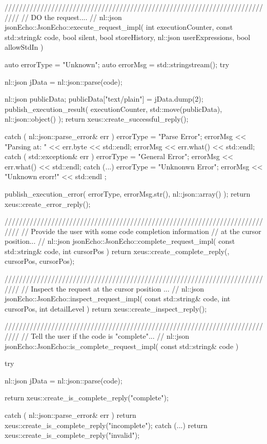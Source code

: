 ////////////////////////////////////////////////////////////////////////////
// DO the request....
//
nl::json jsonEcho::JsonEcho::execute_request_impl(
    int executionCounter,
    const std::string& code,
    bool silent,
    bool storeHistory,
    nl::json userExpressions,
    bool allowStdIn  
) {

  auto errorType = "Unknown";
  auto errorMsg = std::stringstream();
  try {

    nl::json jData = nl::json::parse(code);

    nl::json publicData;
    publicData["text/plain"] = jData.dump(2);
    publish_execution_result(
      executionCounter,
      std::move(publicData),
      nl::json::object()
    );
    return xeus::create_successful_reply();

  } catch ( nl::json::parse_error& err ) {
    errorType = "Parse Error";
    errorMsg << "Parsing at: " << err.byte << std::endl;
    errorMsg << err.what() << std::endl;
  } catch ( std::exception& err ) {
    errorType = "General Error";
    errorMsg << err.what() << std::endl;
  } catch (...) {
    errorType = "Unknonwn Error";
    errorMsg << "Unknown erorr!" << std::endl ;
  }

  publish_execution_error(
    errorType,
    errorMsg.str(),
    nl::json::array()
  );
  return xeus::create_error_reply();
}

////////////////////////////////////////////////////////////////////////////
// Provide the user with some code completion information 
// at the cursor position...
//
nl::json jsonEcho::JsonEcho::complete_request_impl(
  const std::string& code,
  int cursorPos  
) {
  return xeus::create_complete_reply({}, cursorPos, cursorPos);
}

////////////////////////////////////////////////////////////////////////////
// Inspect the request at the cursor position ...
//
nl::json jsonEcho::JsonEcho::inspect_request_impl(
  const std::string& code,
  int cursorPos,
  int detailLevel  
) {
  return xeus::create_inspect_reply();
}

////////////////////////////////////////////////////////////////////////////
// Tell the user if the code is "complete"...
//
nl::json jsonEcho::JsonEcho::is_complete_request_impl(
  const std::string& code
) {
  try {

    nl::json jData = nl::json::parse(code);

    return xeus::create_is_complete_reply("complete");
  } catch ( nl::json::parse_error& err ) {
    return xeus::create_is_complete_reply("incomplete");
  } catch (...) {
  }  
  return xeus::create_is_complete_reply("invalid");
}

